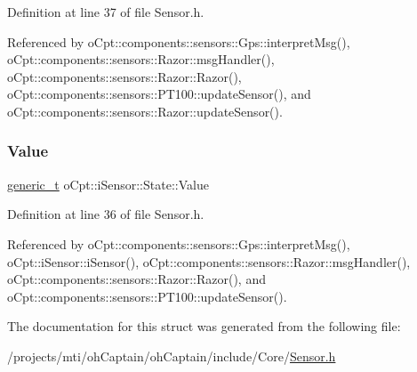 Definition at line 37 of file Sensor.\+h.



Referenced by o\+Cpt\+::components\+::sensors\+::\+Gps\+::interpret\+Msg(), o\+Cpt\+::components\+::sensors\+::\+Razor\+::msg\+Handler(), o\+Cpt\+::components\+::sensors\+::\+Razor\+::\+Razor(), o\+Cpt\+::components\+::sensors\+::\+P\+T100\+::update\+Sensor(), and o\+Cpt\+::components\+::sensors\+::\+Razor\+::update\+Sensor().

\hypertarget{structo_cpt_1_1i_sensor_1_1_state_ad3994c60f8e89120291699653d5c3498}{}\label{structo_cpt_1_1i_sensor_1_1_state_ad3994c60f8e89120291699653d5c3498} 
\subsubsection{\texorpdfstring{Value}{Value}}
{\footnotesize\ttfamily \hyperlink{classo_cpt_1_1i_sensor_a8c83eafe5bdc0074a8c2c405023ee204}{generic\+\_\+t} o\+Cpt\+::i\+Sensor\+::\+State\+::\+Value}



Definition at line 36 of file Sensor.\+h.



Referenced by o\+Cpt\+::components\+::sensors\+::\+Gps\+::interpret\+Msg(), o\+Cpt\+::i\+Sensor\+::i\+Sensor(), o\+Cpt\+::components\+::sensors\+::\+Razor\+::msg\+Handler(), o\+Cpt\+::components\+::sensors\+::\+Razor\+::\+Razor(), and o\+Cpt\+::components\+::sensors\+::\+P\+T100\+::update\+Sensor().



The documentation for this struct was generated from the following file\+:\begin{DoxyCompactItemize}
\item 
/projects/mti/oh\+Captain/oh\+Captain/include/\+Core/\hyperlink{_sensor_8h}{Sensor.\+h}\end{DoxyCompactItemize}
